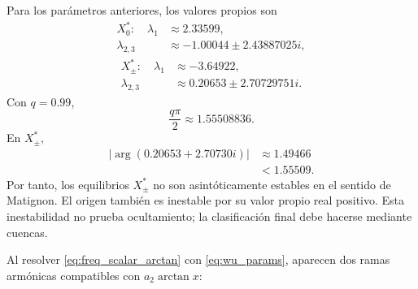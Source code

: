 \documentclass[journal]{IEEEtran}
\begin{document}
Para los parámetros anteriores, los valores propios son
\begin{equation}
\label{eq:wu_eigs_origin}
\begin{aligned}
X_0^*: \quad \lambda_1 &\approx 2.33599,\\
\lambda_{2,3} &\approx -1.00044\pm2.43887025i,
\end{aligned}
\end{equation}
\begin{equation}
\label{eq:wu_eigs_pm}
\begin{aligned}
X_\pm^*: \quad \lambda_1 &\approx -3.64922,\\
\lambda_{2,3} &\approx 0.20653\pm2.70729751i.
\end{aligned}
\end{equation}
Con $q=0.99$,
\begin{equation}
\label{eq:qpi_wu}
\frac{q\pi}{2}\approx1.55508836.
\end{equation}
En $X_\pm^*$,
\begin{equation}
\label{eq:arg_wu}
\begin{aligned}
|\arg(0.20653+2.70730i)|&\approx 1.49466\\
&<1.55509.
\end{aligned}
\end{equation}
Por tanto, los equilibrios $X_\pm^*$ no son asintóticamente estables en el sentido de Matignon. El origen también es inestable por su valor propio real positivo. Esta inestabilidad no prueba ocultamiento; la clasificación final debe hacerse mediante cuencas.

Al resolver \eqref{eq:freq_scalar_arctan} con \eqref{eq:wu_params}, aparecen dos ramas armónicas compatibles con $a_2\arctan x$:
\begin{table}[H]
\centering
\setlength{\tabcolsep}{3pt}
\footnotesize
{}
\caption{Ramas armónicas para el Chua fraccionario con no linealidad $\arctan$ usando los parámetros de Wu \textnormal{\emph{et al}.}}
\label{tab:ramas_wu}
\end{table}
\end{document}
